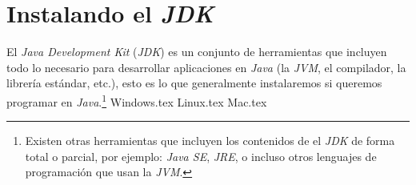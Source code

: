 \section{Instalando el \textit{JDK}}
  El \textit{Java Development Kit} (\textit{JDK}) es un conjunto de herramientas que incluyen 
  todo lo necesario para desarrollar aplicaciones en \textit{Java} (la \textit{JVM}, el 
  compilador, la librería estándar, etc.), esto es lo que generalmente instalaremos si queremos
  programar en \textit{Java}.\footnote{Existen otras herramientas que incluyen los contenidos de 
  el \textit{JDK} de forma total o parcial, por ejemplo: \textit{Java SE}, \textit{JRE}, o 
  incluso otros lenguajes de programación que usan la \textit{JVM}.}
  {Windows.tex}
  {Linux.tex}
  {Mac.tex}
